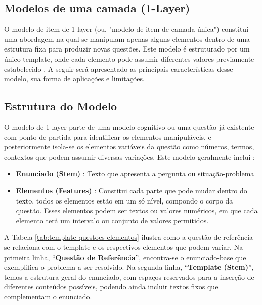\subsection{Modelos de uma camada (1-Layer)}

O modelo de item de 1-layer (ou, "modelo de item de camada única") constitui uma abordagem na qual se manipulam apenas alguns elementos dentro de uma estrutura fixa para produzir novas questões. Este modelo é estruturado por um único template, onde cada elemento pode assumir diferentes valores previamente estabelecido \parencite{lai2013}. A seguir será apresentado as principais características desse modelo, sua forma de aplicações e limitações.

\subsection{Estrutura do Modelo}

O modelo de 1-layer parte de uma modelo cognitivo ou uma questão já existente com ponto de partida para identificar os elementos manipuláveis, e posteriormente isola-se os elementos variáveis da questão como números, termos, contextos que podem assumir diversas variações. Este modelo geralmente inclui : 

\begin{itemize}
    \item \textbf{Enunciado (Stem)} : Texto que apresenta a pergunta ou situação-problema
    \item \textbf{Elementos (Features)} : Constitui cada parte que pode mudar dentro do texto, todos os elementos estão em um só nível, compondo o corpo da questão. Esses elementos podem ser textos ou valores numéricos, em que cada elemento terá um intervalo ou conjunto de valores permitidos.
\end{itemize}

A Tabela \ref{tab:template-questoes-elementos} ilustra como a questão de referência se relaciona com o template e os respectivos elementos que podem variar. Na primeira linha, “\textbf{Questão de Referência}”, encontra-se o enunciado-base que exemplifica o problema a ser resolvido. Na segunda linha, “\textbf{Template (Stem)}”, temos a estrutura geral do enunciado, com espaços reservados para a inserção de diferentes conteúdos possíveis, podendo ainda incluir textos fixos que complementam o enunciado.

